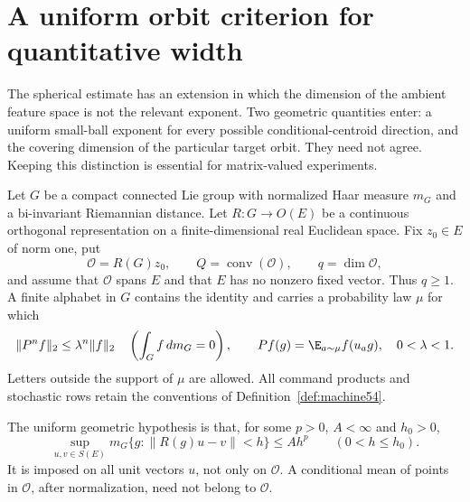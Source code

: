 \section{A uniform orbit criterion for quantitative width}\label{sec:uniform57}
The spherical estimate has an extension in which the dimension of the ambient feature space is not the relevant exponent. Two geometric quantities enter: a uniform small-ball exponent for every possible conditional-centroid direction, and the covering dimension of the particular target orbit. They need not agree. Keeping this distinction is essential for matrix-valued experiments.

Let $G$ be a compact connected Lie group with normalized Haar measure $m_G$ and a bi-invariant Riemannian distance. Let $R:G\to O(E)$ be a continuous orthogonal representation on a finite-dimensional real Euclidean space. Fix $z_0\in E$ of norm one, put
\[
 \mathcal O=R(G)z_0,\qquad Q=\operatorname{conv}(\mathcal O),
 \qquad q=\dim\mathcal O,
\]
and assume that $\mathcal O$ spans $E$ and that $E$ has no nonzero fixed vector. Thus $q\ge1$. A finite alphabet in $G$ contains the identity and carries a probability law $\mu$ for which
\begin{equation}\label{eq:groupgap57}
 \|P^nf\|_2\le\lambda^n\|f\|_2\quad\left(\int_Gf\,dm_G=0\right),
 \qquad Pf(g)=\E_{a\sim\mu}f(u_ag),\quad 0<\lambda<1.
\end{equation}
Letters outside the support of $\mu$ are allowed. All command products and stochastic rows retain the conventions of Definition~\ref{def:machine54}.

The uniform geometric hypothesis is that, for some $p>0$, $A<\infty$ and $h_0>0$,
\begin{equation}\label{eq:smallball57}
 \sup_{u,v\in S(E)}m_G\{g:\|R(g)u-v\|<h\}\le Ah^p
                      \qquad(0<h\le h_0).
\end{equation}
It is imposed on all unit vectors $u$, not only on $\mathcal O$. A conditional mean of points in $\mathcal O$, after normalization, need not belong to $\mathcal O$.


